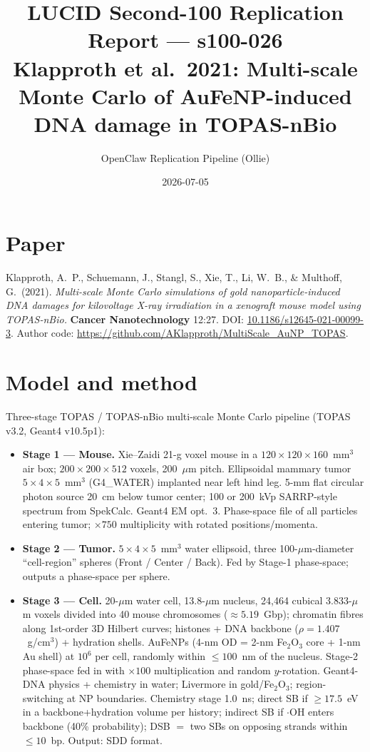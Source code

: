 \documentclass[11pt]{article}
\title{LUCID Second-100 Replication Report --- s100-026\\
\large Klapproth et al.\ 2021: Multi-scale Monte Carlo of AuFeNP-induced\\
DNA damage in TOPAS-nBio}
\author{OpenClaw Replication Pipeline (Ollie)}
\date{2026-07-05}
\begin{document}
\maketitle

\section*{Paper}
Klapproth, A.\ P., Schuemann, J., Stangl, S., Xie, T., Li, W.\ B., \& Multhoff, G.\ (2021).
\emph{Multi-scale Monte Carlo simulations of gold nanoparticle-induced DNA damages for
kilovoltage X-ray irradiation in a xenograft mouse model using TOPAS-nBio.}
\textbf{Cancer Nanotechnology} 12:27.
DOI: \href{https://doi.org/10.1186/s12645-021-00099-3}{10.1186/s12645-021-00099-3}.
Author code: \url{https://github.com/AKlapproth/MultiScale_AuNP_TOPAS}.

\section{Model and method}

Three-stage TOPAS / TOPAS-nBio multi-scale Monte Carlo pipeline
(TOPAS v3.2, Geant4 v10.5p1):

\begin{itemize}
\item \textbf{Stage 1 --- Mouse.} Xie--Zaidi 21-g voxel mouse in a $120\times 120\times 160$~mm$^3$
      air box; $200\times 200\times 512$ voxels, 200~$\mu$m pitch. Ellipsoidal mammary tumor
      $5\times 4\times 5$~mm$^3$ (G4\_WATER) implanted near left hind leg. 5-mm flat circular
      photon source 20~cm below tumor center; 100 or 200~kVp SARRP-style spectrum from
      SpekCalc. Geant4 EM opt.~3. Phase-space file of all particles entering tumor;
      $\times 750$ multiplicity with rotated positions/momenta.
\item \textbf{Stage 2 --- Tumor.} $5\times 4\times 5$~mm$^3$ water ellipsoid, three
      100-$\mu$m-diameter ``cell-region'' spheres (Front / Center / Back). Fed by Stage-1
      phase-space; outputs a phase-space per sphere.
\item \textbf{Stage 3 --- Cell.} 20-$\mu$m water cell, 13.8-$\mu$m nucleus, 24,464 cubical
      3.833-$\mu$m voxels divided into 40 mouse chromosomes ($\approx 5.19$~Gbp); chromatin
      fibres along 1st-order 3D Hilbert curves; histones + DNA backbone
      ($\rho = 1.407$~g/cm$^3$) + hydration shells. AuFeNPs (4-nm OD = 2-nm Fe$_2$O$_3$ core
      + 1-nm Au shell) at $10^6$ per cell, randomly within $\leq 100$~nm of the nucleus.
      Stage-2 phase-space fed in with $\times 100$ multiplication and random $y$-rotation.
      Geant4-DNA physics + chemistry in water; Livermore in gold/Fe$_2$O$_3$;
      region-switching at NP boundaries. Chemistry stage 1.0~ns; direct SB if
      $\geq 17.5$~eV in a backbone+hydration volume per history; indirect SB if $\cdot$OH
      enters backbone (40\% probability); DSB $=$ two SBs on opposing strands within
      $\leq 10$~bp. Output: SDD format.
\end{itemize}
\end{document}
